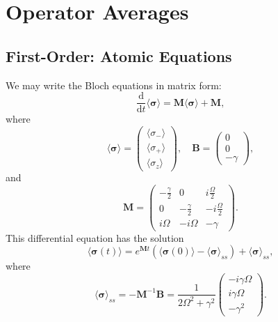 \documentclass{article}
\newcommand{\ddt}[1][]{\frac{\mathrm{d} #1}{\mathrm{d}t}}
\begin{document}
\section{Operator Averages}

\subsection{First-Order: Atomic Equations}

We may write the Bloch equations in matrix form:
\begin{equation}
	\ddt \langle \bm{\sigma} \rangle = \bm{M} \langle \bm{\sigma} \rangle + \bm{M},
\end{equation}
where
\begin{equation}
	\langle \bm{\sigma} \rangle = 
	\begin{pmatrix}
		\langle \sigma_{-} \rangle \\
		\langle \sigma_{+} \rangle \\
		\langle \sigma_{z} \rangle
	\end{pmatrix}
	, \quad \bm{B} = 
	\begin{pmatrix}
		0 \\
		0 \\
		- \gamma
	\end{pmatrix},
\end{equation}
and
\begin{equation}
	\bm{M} = 
	\begin{pmatrix}
		-\frac{\gamma}{2} & 0 & i \frac{\Omega}{2} \\
		0 & -\frac{\gamma}{2} & -i \frac{\Omega}{2} \\
		i \Omega & -i \Omega & -\gamma
	\end{pmatrix}.
\end{equation}
This differential equation has the solution
\begin{equation}
	\langle \bm{\sigma}(t) \rangle = e^{\bm{M} t} \left( \langle \bm{\sigma}(0) \rangle - \langle \bm{\sigma} \rangle_{ss} \right) + \langle \bm{\sigma} \rangle_{ss},
\end{equation}
where
\begin{equation}
	\langle \bm{\sigma} \rangle_{ss} = -\bm{M}^{-1} \bm{B} = \frac{1}{2\Omega^{2} + \gamma^{2}}
	\begin{pmatrix}
		-i \gamma \Omega \\
		i \gamma \Omega \\
		-\gamma^{2}
	\end{pmatrix}.
\end{equation}
\end{document}
